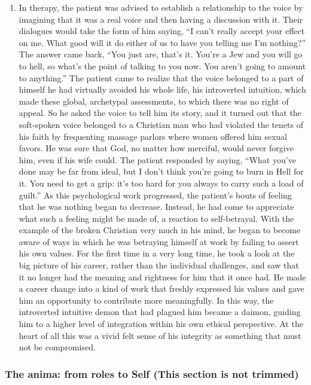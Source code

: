 \begin{enumerate}
\item {} In therapy, the
patient was advised to establish a relationship to the voice by imagining that
it was a real voice and then having a discussion with it. Their dialogues would
take the form of him saying, “I can’t really accept your effect on me. What
good will it do either of us to have you telling me I’m nothing?” The answer
came back, “You just are, that’s it. You’re a Jew and you will go to hell, so
what’s the point of talking to you now. You aren’t going to amount to
anything.” The patient came to realize that the voice belonged to a part of
himself he had virtually avoided his whole life, his introverted intuition,
which made these global, archetypal assessments, to which there was no right of
appeal. So he asked the voice to tell him its story, and it turned out that the
soft-spoken voice belonged to a Christian man who had violated the tenets of
his faith by frequenting massage parlors where women offered him sexual favors.
He was sure that God, no matter how merciful, would never forgive him, even if
his wife could. The patient responded by saying, “What you’ve done may be far
from ideal, but I don’t think you’re going to burn in Hell for it. You need to
get a grip: it’s too hard for you always to carry such a load of guilt.” As
this psychological work progressed, the patient’s bouts of feeling that he was
nothing began to decrease. Instead, he had come to appreciate what such a
feeling might be made of, a reaction to self-betrayal. With the example of the
broken Christian very much in his mind, he began to become aware of ways in
which he was betraying himself at work by failing to assert his own values. For
the first time in a very long time, he took a look at the big picture of his
career, rather than the individual challenges, and saw that it no longer had
the meaning and rightness for him that it once had. He made a career change
into a kind of work that freshly expressed his values and gave him an
opportunity to contribute more meaningfully. In this way, the introverted
intuitive demon that had plagued him became a daimon, guiding him to a higher
level of integration within his own ethical perspective. At the heart of all
this was a vivid felt sense of his integrity as something that must not be
compromised.

\end{enumerate}

\subsubsection{The anima: from roles to Self {\footnotesize (This section is not trimmed)}}

